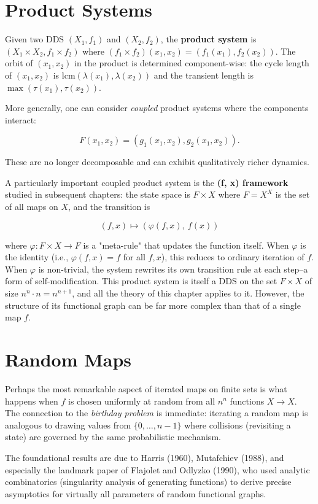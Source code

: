 \section{Product Systems}

Given two DDS $(X_1, f_1)$ and $(X_2, f_2)$, the \textbf{product system} is $(X_1 \times X_2, f_1 \times f_2)$ where $(f_1 \times f_2)(x_1, x_2) = (f_1(x_1), f_2(x_2))$. The orbit of $(x_1, x_2)$ in the product is determined component-wise: the cycle length of $(x_1, x_2)$ is $\text{lcm}(\lambda(x_1), \lambda(x_2))$ and the transient length is $\max(\tau(x_1), \tau(x_2))$.

More generally, one can consider \textit{coupled} product systems where the components interact:

\[F(x_1, x_2) = (g_1(x_1, x_2), g_2(x_1, x_2)).\]

These are no longer decomposable and can exhibit qualitatively richer dynamics.

A particularly important coupled product system is the \textbf{(f, x) framework} studied in subsequent chapters: the state space is $F \times X$ where $F = X^X$ is the set of all maps on $X$, and the transition is

\[(f, x) \longmapsto (\varphi(f, x),\ f(x))\]

where $\varphi: F \times X \to F$ is a "meta-rule" that updates the function itself. When $\varphi$ is the identity (i.e., $\varphi(f,x) = f$ for all $f, x$), this reduces to ordinary iteration of $f$. When $\varphi$ is non-trivial, the system rewrites its own transition rule at each step--a form of self-modification. This product system is itself a DDS on the set $F \times X$ of size $n^n \cdot n = n^{n+1}$, and all the theory of this chapter applies to it. However, the structure of its functional graph can be far more complex than that of a single map $f$.

\section{Random Maps}

Perhaps the most remarkable aspect of iterated maps on finite sets is what happens when $f$ is chosen uniformly at random from all $n^n$ functions $X \to X$. The connection to the \textit{birthday problem} is immediate: iterating a random map is analogous to drawing values from $\{ 0, \ldots, n-1\} $ where collisions (revisiting a state) are governed by the same probabilistic mechanism.

The foundational results are due to Harris (1960), Mutafchiev (1988), and especially the landmark paper of Flajolet and Odlyzko (1990), who used analytic combinatorics (singularity analysis of generating functions) to derive precise asymptotics for virtually all parameters of random functional graphs.

